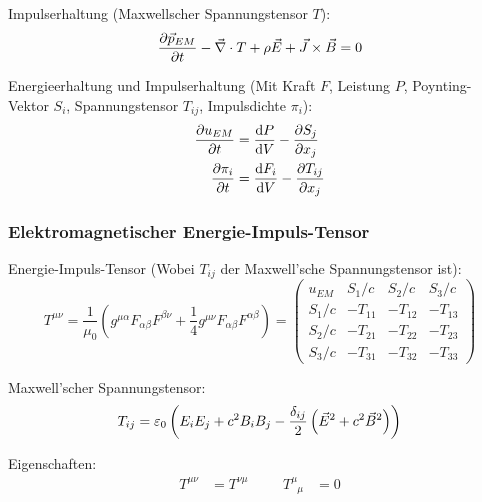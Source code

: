 \documentclass[11pt]{article}
\numberwithin{equation}{section}
\begin{document}
				\noindent
				Impulserhaltung (Maxwellscher Spannungstensor $T$):
				\begin{equation}
					\frac{\partial \vec{p}_{EM}}{\partial t} - \vec{\nabla}\cdot T + \rho \vec{E} + \vec{J}\times\vec{B} = 0
				\end{equation}

				\noindent
				Energieerhaltung und Impulserhaltung (Mit Kraft $F$, Leistung $P$, Poynting-Vektor $S_i$, Spannungstensor $T_{ij}$, Impulsdichte $\pi_i$):
				\begin{equation}
					\begin{aligned}
						\frac{\partial u_{EM}}{\partial t} &= \frac{\mathrm{d} P}{\mathrm{d} V} - \frac{\partial S_j}{\partial x_j} \\
						\frac{\partial \pi_i}{\partial t} &=	\frac{\mathrm{d} F_i}{\mathrm{d} V} - \frac{\partial T_{ij}}{\partial x_j}
					\end{aligned}
				\end{equation}

			\subsubsection{Elektromagnetischer Energie-Impuls-Tensor}
				\noindent
				Energie-Impuls-Tensor (Wobei $T_{ij}$ der Maxwell'sche Spannungstensor ist):
				\begin{equation}
					T^{\mu\nu} = \frac{1}{\mu_0}\left(g^{\mu\alpha} F_{\alpha\beta} F^{\beta\nu} +\frac{1}{4}g^{\mu\nu} F_{\alpha\beta} F^{\alpha\beta} \right)
					= \left( \begin{matrix}
						u_{EM} & S_1/c & S_2/c & S_3/c \\
						S_1/c & -T_{11} & -T_{12} & -T_{13} \\
						S_2/c	& -T_{21} & -T_{22} & -T_{23} \\
						S_3/c & -T_{31} & -T_{32} & -T_{33}
					\end{matrix} \right)
				\end{equation}

				\noindent
				Maxwell'scher Spannungstensor:
				\begin{equation}
					T_{ij} = \varepsilon_0 \left(  E_i E_j + c^2 B_i B_j - \frac{\delta_{ij}}{2}\left(  \vec{E}^2 + c^2 \vec{B}^2  \right)  \right)
				\end{equation}

				\noindent
				Eigenschaften:
				\begin{equation}
					\begin{aligned}
						T^{\mu\nu} &= T^{\nu\mu} &\hspace{20pt}
						T^\mu_{\phantom{\mu}\mu} &= 0 \\
					\end{aligned}
				\end{equation}
\end{document}

